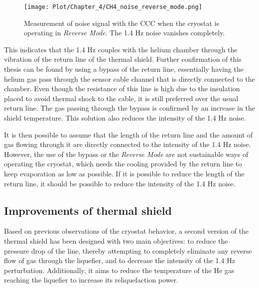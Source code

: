\documentclass[12pt,a4paper]{report}
\begin{document}
        \begin{figure}[H]
        	\centering
        	\texttt{[image: Plot/Chapter\_4/CH4\_noise\_reverse\_mode.png]}
        	\caption{\small{Measurement of noise signal with the CCC when the cryostat is operating in \textit{Reverse Mode}. The 1.4 Hz noise vanishes completely.}}
        	\label{CH4_noise_reverse_mode}
        \end{figure}
        
        This indicates that the 1.4 Hz couples with the helium chamber through the vibration of the return line of the thermal shield. Further confirmation of this thesis can be found by using a bypass of the return line, essentially having the helium gas pass through the sensor cable channel that is directly connected to the chamber. Even though the resistance of this line is high due to the insulation placed to avoid thermal shock to the cable, it is still preferred over the usual return line. The gas passing through the bypass is confirmed by an increase in the shield temperature. This solution also reduces the intensity of the 1.4 Hz noise.
        
        It is then possible to assume that the length of the return line and the amount of gas flowing through it are directly connected to the intensity of the 1.4 Hz noise. However, the use of the bypass or the \textit{Reverse Mode} are not sustainable ways of operating the cryostat, which needs the cooling provided by the return line to keep evaporation as low as possible. If it is possible to reduce the length of the return line, it should be possible to reduce the intensity of the 1.4 Hz noise.
        \subsection{Improvements of thermal shield}
        Based on previous observations of the cryostat behavior, a second version of the thermal shield has been designed with two main objectives: to reduce the pressure drop of the line, thereby attempting to completely eliminate any reverse flow of gas through the liquefier, and to decrease the intensity of the 1.4 Hz perturbation. Additionally, it aims to reduce the temperature of the He gas reaching the liquefier to increase its reliquefaction power.
        
\end{document}
